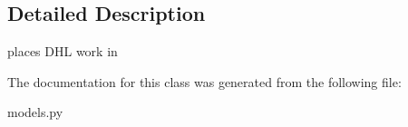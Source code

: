 \subsection{Detailed Description}
\begin{DoxyVerb}places DHL work in \end{DoxyVerb}
 

The documentation for this class was generated from the following file\+:\begin{DoxyCompactItemize}
\item 
models.\+py\end{DoxyCompactItemize}
